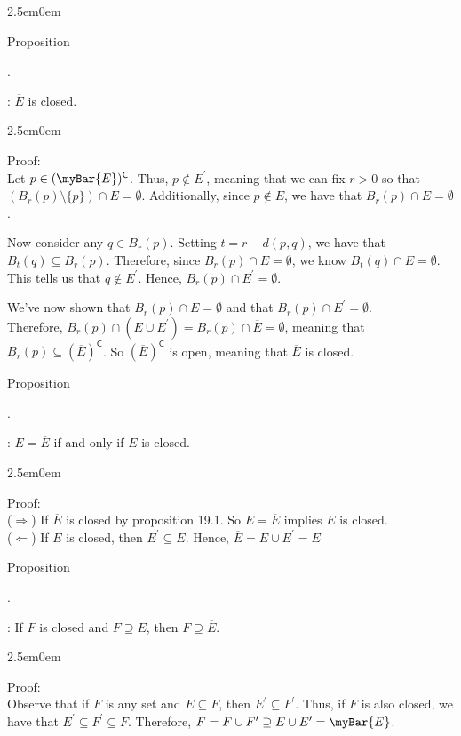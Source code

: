 \documentclass{book}
\newcommand{\hTwo}{%
   \color{MidnightBlue}%
   \fontsize{13}{15}\selectfont%
}
\newcommand{\hThree}{%
   \color{PineGreen}
   \fontsize{13}{15}\selectfont%
}
\newenvironment{myIndent}{%
   \begin{adjustwidth}{2.5em}{0em}%
}{%
   \end{adjustwidth}%
}
\newcommand{\retTwo}{\hfill\bigbreak}
\newcommand{\comp}{\mathsf{C}}
\newcounter{PropNumber}
\newcommand{\propCount}[1][1]{%
   \addtocounter{PropNumber}{#1}%
   \thePropNumber%
}
\newcounter{SubPropNumber}
\newcommand{\subPropCount}[1][1]{%
   \addtocounter{SubPropNumber}{1}%
   \theSubPropNumber%
}
\newcommand{\resetSubPropCount}{%
   \setcounter{SubPropNumber}{0}%
}
\begin{document}
   {\begin{myIndent} \hTwo
      \resetSubPropCount
      Proposition \propCount.\subPropCount: $\overbar{E}$ is closed.

      {\begin{myIndent} \hThree
         Proof:\\
         Let $p \in (\myBar{E})^\comp$. Thus, $p \notin E^\prime$, meaning that we can fix $r>0$ so that\\ $(B_r(p) \setminus \{p\}) \cap E = \emptyset$. Additionally, since $p \notin E$, we have that $B_r(p) \cap E = \emptyset$. \retTwo

         Now consider any $q \in B_r(p)$. Setting $t = r - d(p, q)$, we have that\\ $B_t(q) \subseteq B_r(p)$. Therefore, since $B_r(p) \cap E = \emptyset$, we know $B_t(q) \cap E = \emptyset$. This tells us that $q \notin E^\prime$. Hence, $B_r(p) \cap E^\prime = \emptyset$.
         \retTwo

         We've now shown that $B_r(p) \cap E = \emptyset$ and that $B_r(p) \cap E^\prime = \emptyset$.\\ Therefore, $B_r(p) \cap (E \cup E^\prime) = B_r(p) \cap \overbar{E} = \emptyset$, meaning that $B_r(p) \subseteq (\overbar{E})^\comp$. So $(\overbar{E})^\comp$ is open, meaning that $\overbar{E}$ is closed.
      \end{myIndent}}

      \newpage

      Proposition \propCount[0].\subPropCount: $E = \overbar{E}$ if and only if $E$ is closed.

      {\begin{myIndent} \hThree
         Proof:\\
         ($\Longrightarrow$) If $\overbar{E}$ is closed by proposition 19.1. So $E = \overbar{E}$ implies $E$ is closed.\\
         ($\Longleftarrow$) If $E$ is closed, then $E^\prime \subseteq E$. Hence, $\overbar{E} = E \cup E^\prime = E$ \retTwo
      \end{myIndent}}

      Proposition \propCount[0].\subPropCount: If $F$ is closed and $F \supseteq E$, then $F \supseteq \overbar{E}$.

      {\begin{myIndent} \hThree
         Proof:\\
         Observe that if $F$ is any set and $E \subseteq F$, then $E^\prime \subseteq F^\prime$. Thus, if $F$ is also closed, we have that $E^\prime \subseteq F^\prime \subseteq F$. Therefore, $F = F \cup F^\prime \supseteq E \cup E^\prime = \myBar{E}$.
         \retTwo
      \end{myIndent}}
   \end{myIndent}}
\end{document}
